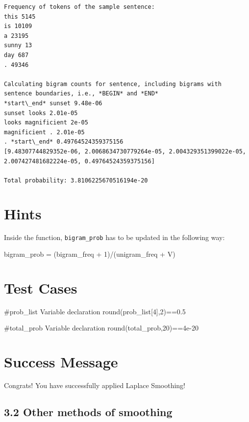 \documentclass[11pt]{article}
\newenvironment{Shaded}{}{}
\newcommand{\DecValTok}[1]{\textcolor[rgb]{0.25,0.63,0.44}{{#1}}}
\newcommand{\NormalTok}[1]{{#1}}
\newcommand{\OperatorTok}[1]{\textcolor[rgb]{0.40,0.40,0.40}{{#1}}}
\begin{document}
    \begin{Verbatim}[commandchars=\\\{\}]
Frequency of tokens of the sample sentence:
this 5145
is 10109
a 23195
sunny 13
day 687
. 49346

Calculating bigram counts for sentence, including bigrams with sentence boundaries, i.e., *BEGIN* and *END*
*start\_end* sunset 9.48e-06
sunset looks 2.01e-05
looks magnificient 2e-05
magnificient . 2.01e-05
. *start\_end* 0.49764524359375156
[9.48307744829352e-06, 2.0068634730779264e-05, 2.004329351399022e-05, 2.007427481682224e-05, 0.49764524359375156]

Total probability: 3.8106225670516194e-20

    \end{Verbatim}

    \hypertarget{hints}{%
\section{Hints}\label{hints}}

Inside the function, \texttt{bigram\_prob} has to be updated in the
following way:

\begin{Shaded}
\begin{Highlighting}[]
\NormalTok{    bigram_prob }\OperatorTok{=}\NormalTok{ (bigram_freq }\OperatorTok{+} \DecValTok{1}\NormalTok{)}\OperatorTok{/}\NormalTok{(unigram_freq }\OperatorTok{+}\NormalTok{ V)}
\end{Highlighting}
\end{Shaded}

\hypertarget{test-cases}{%
\section{Test Cases}\label{test-cases}}

\#prob\_list Variable declaration round(prob\_list{[}4{]},2)==0.5

\#total\_prob Variable declaration round(total\_prob,20)==4e-20

    \hypertarget{success-message}{%
\section{Success Message}\label{success-message}}

Congrats! You have successfully applied Laplace Smoothing!

    \hypertarget{other-methods-of-smoothing}{%
\subsection{3.2 Other methods of
smoothing}\label{other-methods-of-smoothing}}
\end{document}
